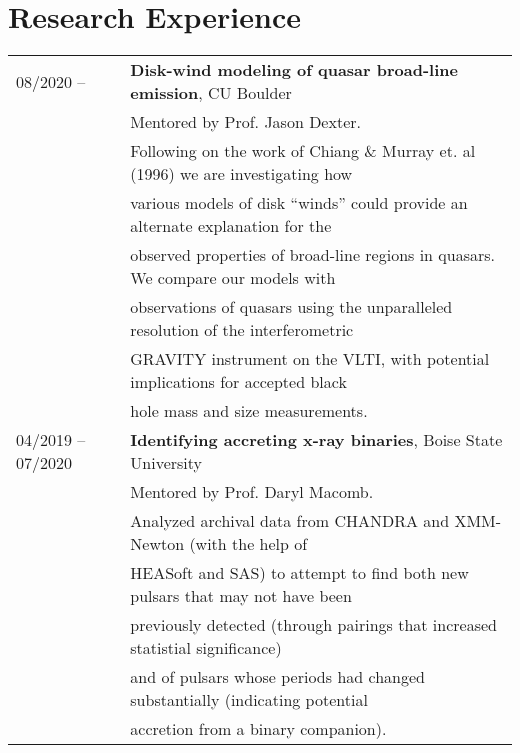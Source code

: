 \documentclass[11pt]{article}
\begin{document}
\section{Research Experience}
\begin{tabular}{ll}
08/2020 -- & 	\textbf{Disk-wind modeling of quasar broad-line emission}, CU Boulder \vspace{1mm} \\
			&	Mentored by Prof. Jason Dexter.\vspace{1mm} \\
      & Following on the work of Chiang \& Murray et. al (1996) we are investigating how \\
      & various models of disk ``winds'' could provide an alternate explanation for the \\
      & observed properties of broad-line regions in quasars. We compare our models with \\
      & observations of quasars using the unparalleled resolution of the interferometric \\
      & GRAVITY instrument on the VLTI, with potential implications for accepted black \\
      & hole mass and size measurements.\vspace{1mm}\\
04/2019 -- 07/2020		& 	\textbf{Identifying accreting x-ray binaries}, Boise State University \vspace{1mm} \\
			&	Mentored by Prof. Daryl Macomb.\vspace{1mm} \\
      & Analyzed archival data from CHANDRA and XMM-Newton (with the help of \\
      & HEASoft and SAS) to attempt to find both new pulsars that may not have been\\
      & previously detected (through pairings that increased statistial significance) \\
      & and of pulsars whose periods had changed substantially (indicating potential \\
      & accretion from a binary companion).\\

\end{tabular}
\end{document}
